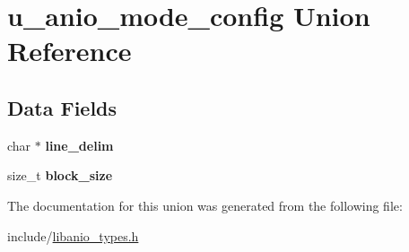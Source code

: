 \hypertarget{unionu__anio__mode__config}{}\section{u\+\_\+anio\+\_\+mode\+\_\+config Union Reference}
\label{unionu__anio__mode__config}
\subsection*{Data Fields}
\begin{DoxyCompactItemize}
\item 
\hypertarget{unionu__anio__mode__config_a086980d7c511206aac676e1e2668ce36}{}char $\ast$ {\bfseries line\+\_\+delim}\label{unionu__anio__mode__config_a086980d7c511206aac676e1e2668ce36}

\item 
\hypertarget{unionu__anio__mode__config_af8f44ef5e87fd4a46586960af28044f5}{}size\+\_\+t {\bfseries block\+\_\+size}\label{unionu__anio__mode__config_af8f44ef5e87fd4a46586960af28044f5}

\end{DoxyCompactItemize}


The documentation for this union was generated from the following file\+:\begin{DoxyCompactItemize}
\item 
include/\hyperlink{libanio__types_8h}{libanio\+\_\+types.\+h}\end{DoxyCompactItemize}
